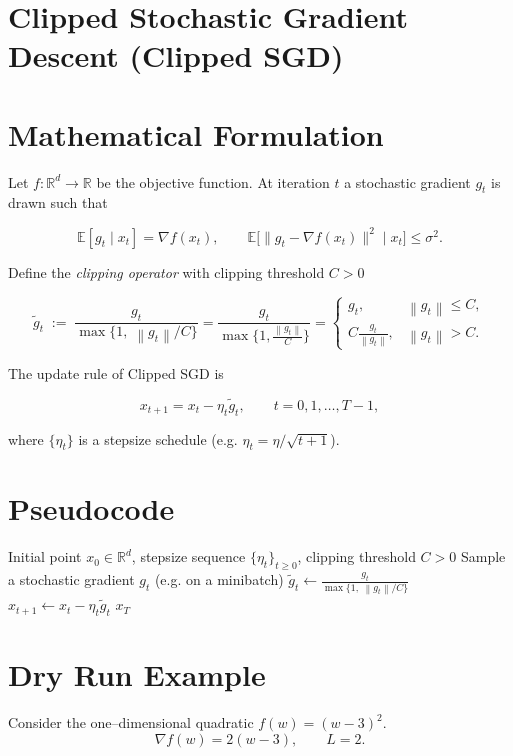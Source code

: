 \documentclass{article}
\newcommand{\EE}{\mathbb{E}}
\newcommand{\norm}[1]{\left\|#1\right\|}
\newcommand{\clip}[2]{\frac{#1}{\max\{1,\; \norm{#1}/#2\}}}
\begin{document}
\section*{Clipped Stochastic Gradient Descent (Clipped SGD)}

\section*{Mathematical Formulation}
Let $f:\mathbb R^d\rightarrow\mathbb R$ be the objective function.  
At iteration $t$ a stochastic gradient $g_t$ is drawn such that  

\[
\EE[g_t\mid x_t]=\nabla f(x_t),\qquad
\EE\big[\|g_t-\nabla f(x_t)\|^2\mid x_t\big]\le\sigma^2 .
\]

Define the \emph{clipping operator} with clipping threshold $C>0$  

\[
\tilde g_t\;:=\;\clip{g_t}{C}
        =\frac{g_t}{\max\!\Big\{1,\frac{\norm{g_t}}{C}\Big\}}
        =\begin{cases}
            g_t, & \norm{g_t}\le C,\\[4pt]
            \displaystyle C\frac{g_t}{\norm{g_t}}, & \norm{g_t}> C .
          \end{cases}
\tag{1}
\]

The update rule of Clipped SGD is  

\[
x_{t+1}=x_t-\eta_t \tilde g_t ,\qquad t=0,1,\dots,T-1,
\tag{2}
\]

where $\{\eta_t\}$ is a stepsize schedule (e.g. $\eta_t=\eta/\sqrt{t+1}$).  

\section*{Pseudocode}
\begin{algorithm}[H]
\caption{Clipped SGD}
\begin{algorithmic}[1]
\Require Initial point $x_0\in\mathbb R^d$, stepsize sequence $\{\eta_t\}_{t\ge0}$, clipping threshold $C>0$
    \State Sample a stochastic gradient $g_t$ (e.g. on a minibatch)
    \State $\displaystyle \tilde g_t \gets \frac{g_t}{\max\{1,\;\norm{g_t}/C\}}$ 
    \State $x_{t+1}\gets x_t-\eta_t \tilde g_t$
\EndFor
\State \Return $x_T$
\end{algorithmic}
\end{algorithm}

\section*{Dry Run Example}
Consider the one–dimensional quadratic $f(w)=(w-3)^2$.
\[
\nabla f(w)=2(w-3), \qquad L=2 .
\]
\end{document}

